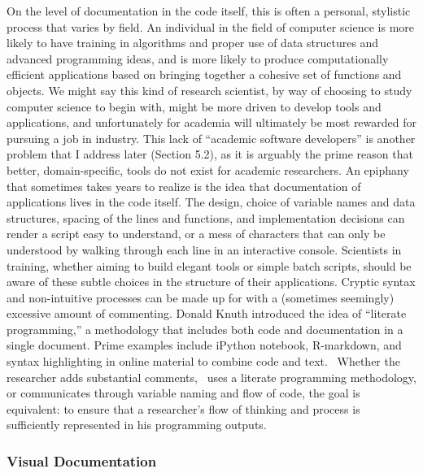 \documentclass{report}
\begin{document}
On the level of documentation in the code itself, this is often a
personal, stylistic process that varies by field. An individual in the
field of computer science is more likely to have training in algorithms
and proper use of data structures and advanced programming ideas, and is
more likely to produce computationally efficient applications based on
bringing together a cohesive set of functions and objects. We might say
this kind of research scientist, by way of choosing to study computer
science to begin with, might be more driven to develop tools and
applications, and unfortunately for academia will ultimately be most
rewarded for pursuing a job in industry. This lack of ``academic
software developers'' is another problem that I address later (Section
5.2), as it is arguably the prime reason that better, domain-specific,
tools do not exist for academic researchers. An epiphany that sometimes
takes years to realize is the idea that documentation of applications
lives in the code itself. The design, choice of variable names and data
structures, spacing of the lines and functions, and implementation
decisions can render a script easy to understand, or a mess of
characters that can only be understood by walking through each line in
an interactive console. Scientists in training, whether aiming to build
elegant tools or simple batch scripts, should be aware of these subtle
choices in the structure of their applications. Cryptic syntax and
non-intuitive processes can be made up for with a (sometimes seemingly)
excessive amount of commenting. Donald Knuth introduced the idea of
``literate programming,'' \cite{noauthor_undated-xh} a
methodology that includes both code and documentation in a single
document. Prime examples include iPython notebook, R-markdown, and
syntax highlighting in online material to combine code and text.
~Whether the researcher adds substantial comments, ~uses a literate
programming methodology, or communicates through variable naming and
flow of code, the goal is equivalent: to ensure that a researcher's flow
of thinking and process is sufficiently represented in his programming
outputs.

\subsubsection{Visual Documentation}
\end{document}
